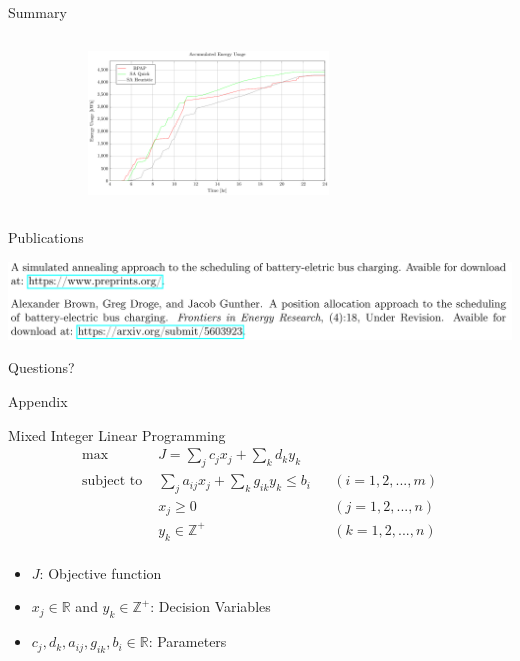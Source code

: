 \documentclass[aspectratio=169,dvipsnames]{beamer}
\begin{document}
\begin{frame}[label={sec:orgc246b89}]{Summary}
\begin{columns}
\begin{column}{0.5\columnwidth}
\begin{figure}[htpb]
\begin{subfigure}[t]{\textwidth}
\centering
    \includegraphics[width=0.7\textwidth]{img/sa-pap-paper-good/energy-zoom}
\end{subfigure}
\end{figure}
\end{column}
\end{columns}
\end{frame}

\begin{frame}[label={sec:org3fc2978}]{Publications}
\begin{center}
\includegraphics[width=.9\linewidth]{./img/pub.png}
\end{center}
\end{frame}

\begin{frame}[label={sec:orgc974254}]{}
\centering
\Huge Questions?
\end{frame}

\appendix
\begin{frame}[label={sec:org79d0d9d}]{}
\centering
\Huge Appendix
\end{frame}

\begin{frame}[label={sec:org8c03175}]{Mixed Integer Linear Programming}
\begin{align*}
\text{max }        &J = \sum_j c_j x_j + \sum_k d_k y_k&         &               \\
\text{subject to } &\sum_j a_{ij} x_j + \sum_k g_{ik} y_k \le b_i&  &(i = 1,2,...,m)\\
                  &x_j \ge 0&                              &(j = 1,2,...,n)\\
                  &y_k \in \mathbb{Z^+}&                   &(k = 1,2,...,n)\\
\end{align*}

\begin{itemize}
\item \(J\): Objective function
\item \(x_j \in \mathbb{R}\) and \(y_k \in \mathbb{Z}^+\): Decision Variables
\item \(c_j, d_k, a_{ij}, g_{ik}, b_i \in \mathbb{R}\): Parameters
\end{itemize}
\end{frame}
\end{document}
